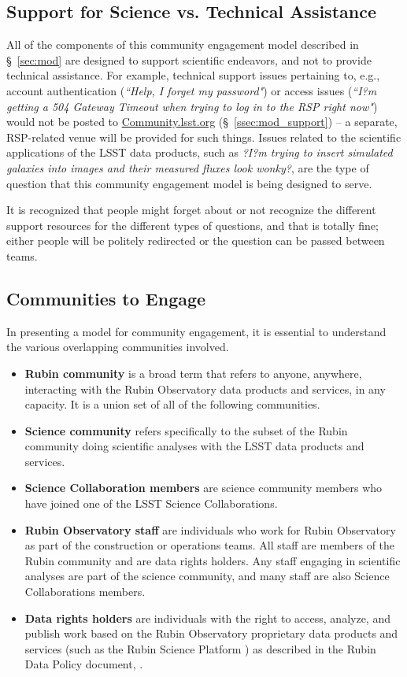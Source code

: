 \documentclass[DM,lsstdraft,toc]{lsstdoc}
\begin{document}
\subsection{Support for Science vs. Technical Assistance}\label{ssec:intro_tech}

All of the components of this community engagement model described in \S~\ref{sec:mod} are designed to support scientific endeavors, and not to provide technical assistance.
For example, technical support issues pertaining to, e.g., account authentication (\textit{``Help, I forget my password"}) or access issues (\textit{``I?m getting a 504 Gateway Timeout when trying to log in to the RSP right now"}) would not be posted to \url{Community.lsst.org} (\S~\ref{ssec:mod_support}) -- a separate, RSP-related venue will be provided for such things.
Issues related to the scientific applications of the LSST data products, such as \textit{?I?m trying to insert simulated galaxies into images and their measured fluxes look wonky?}, are the type of question that this community engagement model is being designed to serve.

It is recognized that people might forget about or not recognize the different support resources for the different types of questions, and that is totally fine; either people will be politely redirected or the question can be passed between teams.


\subsection{Communities to Engage}\label{ssec:intro_comms}

In presenting a model for community engagement, it is essential to understand the various overlapping communities involved.

\begin{itemize}
\item \textbf{Rubin community} is a broad term that refers to anyone, anywhere, interacting with the Rubin Observatory data products and services, in any capacity. It is a union set of all of the following communities.
\item \textbf{Science community} refers specifically to the subset of the Rubin community doing scientific analyses with the LSST data products and services.
\item \textbf{Science Collaboration members} are science community members who have joined one of the LSST Science Collaborations.
\item \textbf{Rubin Observatory staff} are individuals who work for Rubin Observatory as part of the construction or operations teams. All staff are members of the Rubin community and are data rights holders. Any staff engaging in scientific analyses are part of the science community, and many staff are also Science Collaborations members.
\item \textbf{Data rights holders} are individuals with the right to access, analyze, and publish work based on the Rubin Observatory proprietary data products and services (such as the Rubin Science Platform ) as described in the Rubin Data Policy document, . 
\end{itemize}
\end{document}
